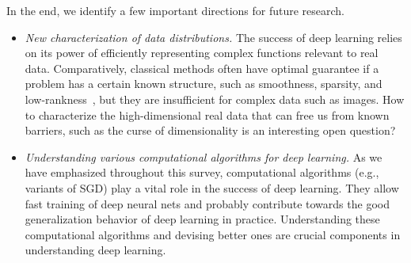In the end, we identify a few important directions for future research.
\begin{itemize}
\item{\emph{New characterization of data distributions.} The success of deep learning relies on its power of efficiently representing complex functions relevant to real data. Comparatively, classical methods often have optimal guarantee if a problem has a certain known structure, such as smoothness, sparsity, and low-rankness~\citep{stone1982optimal, donoho1994ideal, candes2009power,chen2019noisy}, but they are insufficient for complex data such as images. How to characterize the high-dimensional real data that can free us from known barriers, such as the curse of dimensionality is an interesting open question? %
}


\item \emph{Understanding various computational algorithms for deep learning.} As we have emphasized throughout this survey, computational algorithms (e.g., variants of SGD) play a vital role in the success of deep learning. They allow fast training of deep neural nets and probably contribute towards the good generalization behavior of deep learning in practice. Understanding these computational algorithms and devising better ones are crucial components in understanding deep learning. 



\end{itemize}
